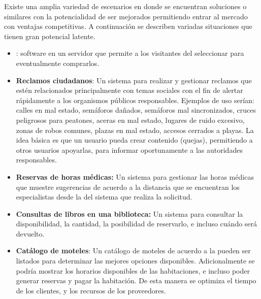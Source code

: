 
		Existe una amplia variedad de escenarios en donde se encuentran soluciones \ecommerceCOM o similares con la potencialidad de ser mejorados permitiendo entrar al mercado con ventajas competitivas. A continuación se describen variadas situaciones que tienen gran potencial latente.

		\begin{itemize}
			\item
				\textbf{\shoppingCart}: \ecommerceCOM software en un servidor \webINT que permite a los visitantes del \websiteINT seleccionar \itemsCOM para eventualmente comprarlos.
			
			\item
				\textbf{Reclamos ciudadanos}: Un sistema para realizar y gestionar reclamos que estén relacionados principalmente con temas sociales con el fin de alertar rápidamente a los organismos públicos responsables. Ejemplos de uso serían: calles en mal estado, semáforos dañados, semáforos mal sincronizados, cruces peligrosos para peatones, aceras en mal estado, lugares de ruido excesivo, zonas de robos comunes, plazas en mal estado, accesos cerrados a playas. La idea básica es que un usuario pueda crear contenido (quejas), permitiendo a otros usuarios apoyarlas, para informar oportunamente a las autoridades responsables.
			
			\item 
				\textbf{Reservas de horas médicas:} Un sistema para gestionar las horas médicas que muestre sugerencias de acuerdo a la distancia que se encuentran los especialistas desde la \geoPositionCPT del sistema que realiza la solicitud. 
			
			\item
				\textbf{Consultas de libros en una biblioteca:} Un sistema para consultar la disponibilidad, la cantidad, la posibilidad de reservarlo, e incluso cuándo será devuelto.

			\item
				\textbf{Catálogo de moteles}: Un catálogo de moteles de acuerdo a la \geoPositionCPT pueden ser listados para determinar las mejores opciones disponibles. Adicionalmente se podría mostrar los horarios disponibles de las habitaciones, e incluso poder generar reservas y pagar la habitación. De esta manera se optimiza el tiempo de los clientes, y los recursos de los proveedores.
			

\end{itemize}
